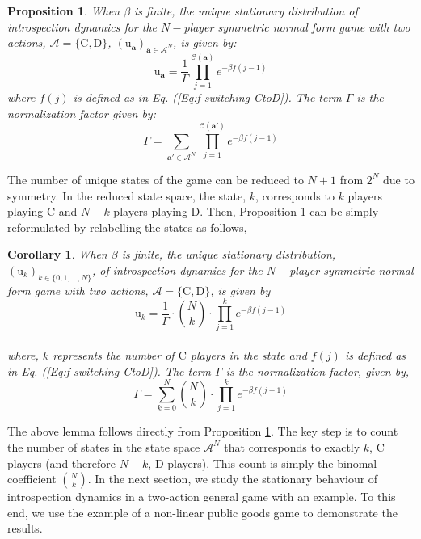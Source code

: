 \documentclass[11pt]{article}
\theoremstyle{plainCl1}
\newtheorem{Prop}{Proposition}
\theoremstyle{plainCl2}
\newtheorem{Corollary}{Corollary}
\newcommand{\abf}{\mathbf{a}}
\newcommand{\C}{\mathrm{C}}
\newcommand{\D}{\mathrm{D}}
\begin{document}
\begin{Prop}
\label{Prop:Symmetric-2-strategies-state}
When $\beta$ is finite, the unique stationary distribution of introspection dynamics for the $N-$player symmetric normal form game with two actions, $\mathcal{A} = \{\C, \D \}$, $(\mathrm{u}_{\abf})_{\abf \in \mathcal{A}^N}$, is given by:
\begin{equation}
\label{Eq:stationary-dist-symm-2-stgs-state}
\mathrm{u}_\abf = \frac{1}{\Gamma} \displaystyle \prod_{j=1}^{\mathcal{C}(\abf)} \displaystyle e^{-\beta f(j-1)}
\end{equation}
where $f(j)$ is defined as in Eq. (\ref{Eq:f-switching-CtoD}). The term $\Gamma$ is the normalization factor given by:
\begin{equation}
\label{Eq:stationary-dist-normalization-symm-2-stgs-state}
\Gamma = \displaystyle \sum_{\abf' \in \mathcal{A}^N} \prod_{j = 1}^{\mathcal{C}(\abf')} \displaystyle e^{-\beta f(j-1)}
\end{equation}
\end{Prop}


\noindent The number of unique states of the game can be reduced to $N+1$ from $2^N$ due to symmetry. In the reduced state space, the state, $k$, corresponds to $k$ players playing $\C$ and $N-k$ players playing $\D$. Then, Proposition \ref{Prop:Symmetric-2-strategies-state} can be simply reformulated by relabelling the states as follows,


\begin{Corollary}
\label{Lemma: Symmetric-2-stg}
When $\beta$ is finite, the unique stationary distribution, $(\mathrm{u}_k)_{k \in \{0,1,...,N\}}$, of introspection dynamics for the $N-$player symmetric normal form game with two actions, $\mathcal{A} = \{\C, \D \}$, is given by \\
\begin{equation}
\label{Eq:stationary-dist-symm-2-stgs}
\mathrm{u}_k = \frac{1}{\Gamma} \cdot {N \choose k} \cdot \displaystyle \prod_{j=1}^{k} \displaystyle e^{-\beta f(j-1)}
\end{equation} \\ 
where, $k$ represents the number of $\C$ players in the state and $f(j)$ is defined as in Eq. (\ref{Eq:f-switching-CtoD}). The term $\Gamma$ is the normalization factor, given by, \\
\begin{equation}
\label{Eq:normalization-Tk}
\Gamma = \displaystyle \sum_{k=0}^N {N \choose k} \cdot \displaystyle \prod_{j=1}^{k} \displaystyle e^{-\beta f(j-1)}
\end{equation}
\end{Corollary}
\noindent The above lemma follows directly from Proposition \ref{Prop:Symmetric-2-strategies-state}. The key step is to count the number of states in the state space $\mathcal{A}^N$ that corresponds to exactly $k$, $\C$ players (and therefore $N-k$, $\D$ players). This count is simply the binomal coefficient $N \choose k$. In the next section, we study the stationary behaviour of introspection dynamics in a two-action general game with an example. To this end, we use the example of a non-linear public goods game to demonstrate the results. 
\end{document}
